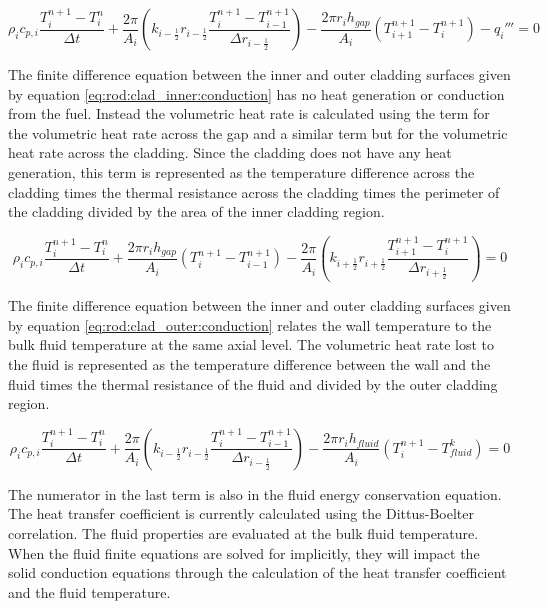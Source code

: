\begin{equation}
	\label{eq:rod:fuel_surface:conduction}
	  \rho_{i}c_{p,i}\frac{T^{n+1}_{i}-T^{n}_{i}}{\Delta t}
	+ \frac{2\pi}{A_{i}}
 	    \left(k_{i-\frac{1}{2}}r_{i-\frac{1}{2}}
		\frac{T^{n+1}_{i}-T^{n+1}_{i-1}}{\Delta r_{i-\frac{1}{2}}}\right)
	- \frac{2\pi r_{i}h_{gap}}{A_{i}}\left(T^{n+1}_{i+1}-T^{n+1}_{i}\right)
	- q_{i}'''
	= 0
\end{equation}

The finite difference equation between the inner and outer cladding surfaces
given by equation \ref{eq:rod:clad_inner:conduction} has no heat generation or
conduction from the fuel. Instead the  volumetric heat rate is calculated using
the term for the volumetric heat rate  across the gap and a similar term but for
the volumetric heat rate across the cladding. Since the cladding does not have
any heat generation, this  term is represented as the temperature difference
across the cladding times the thermal resistance across the cladding  times the
perimeter of the cladding divided by the area of the inner cladding region.

\begin{equation}
	\label{eq:rod:clad_inner:conduction}
	  \rho_{i}c_{p,i}\frac{T^{n+1}_{i}-T^{n}_{i}}{\Delta t}
	+ \frac{2\pi r_{i}h_{gap}}{A_{i}}\left(T^{n+1}_{i}-T^{n+1}_{i-1}\right)
	- \frac{2\pi}{A_{i}}
 	    \left(k_{i+\frac{1}{2}}r_{i+\frac{1}{2}}
		\frac{T^{n+1}_{i+1}-T^{n+1}_{i}}{\Delta r_{i+\frac{1}{2}}}\right)
	= 0
\end{equation}

The finite difference equation between the inner and outer cladding surfaces
given by equation \ref{eq:rod:clad_outer:conduction} relates the wall
temperature to the bulk fluid temperature at the same axial level. The
volumetric heat rate lost to the fluid is represented as the temperature
difference between the wall and the fluid times the thermal resistance of the
fluid and divided by the outer cladding region.

\begin{equation}
	\label{eq:rod:clad_outer:conduction}
	  \rho_{i}c_{p,i}\frac{T^{n+1}_{i}-T^{n}_{i}}{\Delta t}
	+ \frac{2\pi}{A_{i}}
 	    \left(k_{i-\frac{1}{2}}r_{i-\frac{1}{2}}
		\frac{T^{n+1}_{i}-T^{n+1}_{i-1}}{\Delta r_{i-\frac{1}{2}}}\right)
    - \frac{2\pi r_{i}h_{fluid}}{A_{i}}\left(T^{n+1}_{i}-T^{k}_{fluid}\right)
	= 0
\end{equation}

The numerator in the last term is also in the fluid energy conservation
equation. The heat transfer coefficient is currently calculated using the
Dittus-Boelter correlation. The fluid properties are evaluated at the bulk fluid
temperature. When the fluid finite equations are solved for implicitly, they
will impact the solid conduction equations through the calculation of the heat
transfer coefficient and the fluid temperature.